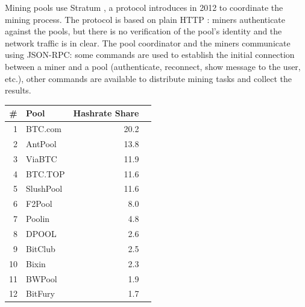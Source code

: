 \bigskip
Mining pools use Stratum \cite{stratum}, a protocol introduces in \num{2012} to coordinate the mining process.
The protocol is based on plain HTTP \cite{stratum_manual}:
miners authenticate against the pools, but there is no verification of the pool's identity and the network traffic is in clear.
The pool coordinator and the miners communicate using JSON-RPC:
some commands are used to establish the initial connection between a miner and a pool (authenticate, reconnect, show message to the user, etc.), other commands are available to distribute mining tasks and collect the results.

\pagebreak

\begin{table}[h!]
	\centering
	\begin{tabular}{rlrr}
		\toprule
		\multicolumn{1}{c}{\#} & \multicolumn{1}{l}{Pool} & \multicolumn{1}{c}{Hashrate Share} \\
		\midrule
		\num{1}                & BTC.com                  & \num{20.2}                         \\
		\num{2}                & AntPool                  & \num{13.8}                         \\
		\num{3}                & ViaBTC                   & \num{11.9}                         \\
		\num{4}                & BTC.TOP                  & \num{11.6}                         \\
		\num{5}                & SlushPool                & \num{11.6}                         \\
		\num{6}                & F2Pool                   & \num{8.0}                          \\
		\num{7}                & Poolin                   & \num{4.8}                          \\
		\num{8}                & DPOOL                    & \num{2.6}                          \\
		\num{9}                & BitClub                  & \num{2.5}                          \\
		\num{10}               & Bixin                    & \num{2.3}                          \\
		\num{11}               & BWPool                   & \num{1.9}                          \\
		\num{12}               & BitFury                  & \num{1.7}                          \\

\end{tabular}
\end{table}
